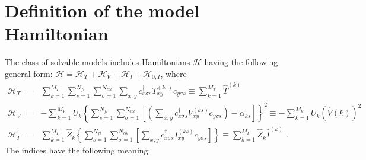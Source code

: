 
\section{Definition of the model Hamiltonian}


 
The class of solvable models includes  Hamiltonians $\mathcal{H}$ having the following general form:
${\mathcal{H}=\mathcal{H}_{T}+\mathcal{H}_{V}} +  \mathcal{H}_{I} +   \mathcal{H}_{0,I}  $, where
\begin{eqnarray}
\label{eqn_general_ham2}
\mathcal{H}_{T}
&=&
\sum\limits_{k=1}^{M_T}
\sum\limits_{s=1}^{N_{fl}}
\sum\limits_{\sigma=1}^{N_{col}}
\sum\limits_{x,y}
c^{\dagger}_{x \sigma   s}T_{xy}^{(k s)} c^{\phantom\dagger}_{y \sigma s}  \equiv  \sum\limits_{k=1}^{M_T} \hat{T}^{(k)}\\
\mathcal{H}_{V}
&=&
-
\sum\limits_{k=1}^{M_V}U_{k}
\left\{
\sum\limits_{s=1}^{N_{fl}}
\sum\limits_{\sigma=1}^{N_{col}}
\left[
\left(
\sum\limits_{x,y}
c^{\dagger}_{x \sigma s}V_{xy}^{(k s)}c^{\phantom\dagger}_{y \sigma s}
\right)
-\alpha_{k s} 
\right]
\right\}^{2}  \equiv   -
\sum\limits_{k=1}^{M_V}U_{k}   \left(\hat{V}{(k)} \right)^2\\ 
\mathcal{H}_{I}  & = &
\sum\limits_{k=1}^{M_I} \hat{Z}_{k} 
\left\{
\sum\limits_{s=1}^{N_{fl}}
\sum\limits_{\sigma=1}^{N_{col}}
\left[
\sum\limits_{x,y}
c^{\dagger}_{x \sigma s} I_{xy}^{(k s)}c^{\phantom\dagger}_{y \sigma s}
\right]
\right\} \equiv \sum\limits_{k=1}^{M_I} \hat{Z}_{k}    \hat{I}^{(k)} 
\;.
\end{eqnarray}
The indices have the following meaning:
